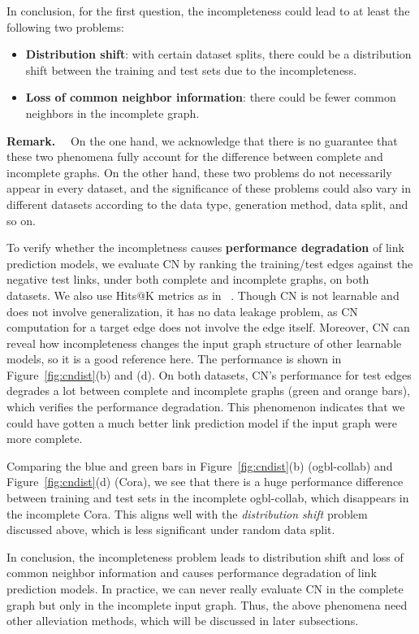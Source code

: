 \documentclass{article}
\theoremstyle{plain}
\theoremstyle{definition}
\theoremstyle{remark}
\begin{document}
In conclusion, for the first question, the incompleteness could lead to at least the following two problems:
\begin{itemize}
[itemsep=0pt,topsep=0pt,parsep=0pt]
    \item \textbf{Distribution shift}: with certain dataset splits, there could be a distribution shift between the training and test sets due to the incompleteness.
    \item \textbf{Loss of common neighbor information}: there could be fewer common neighbors in the incomplete graph. 
\end{itemize}

\textbf{Remark.}~~  On the one hand, we acknowledge that there is no guarantee that these two phenomena fully account for the difference between complete and incomplete graphs. On the other hand, these two problems do not necessarily appear in every dataset, and the significance of these problems could also vary in different datasets according to the data type, generation method, data split, and so on. 


To verify whether the incompletness causes \textbf{performance degradation} of link prediction models, we evaluate CN by ranking the training/test edges against the negative test links, under both complete and incomplete graphs, on both datasets. We also use Hits@K metrics as in ~\citep{Gsketch}.
Though CN is not learnable and does not involve generalization, it has no data leakage problem, as
CN computation for a target edge does not involve the edge itself. Moreover, CN can reveal how incompleteness changes the input graph structure of other learnable models, so it is a good reference here. The performance is shown in Figure~\ref{fig:cndist}(b) and (d). On both datasets, CN's performance for test edges degrades a lot between complete and incomplete graphs (green and orange bars), which verifies the performance degradation. This phenomenon indicates that we could have gotten a much better link prediction model if the input graph were more complete.


Comparing the blue and green bars in Figure~\ref{fig:cndist}(b) (ogbl-collab) and Figure~\ref{fig:cndist}(d) (Cora), we see that there is a huge performance difference between training and test sets in the incomplete ogbl-collab, which disappears in the incomplete Cora. This aligns well with the \textit{distribution shift} problem discussed above, which is less significant under random data split. 

In conclusion, the incompleteness problem leads to distribution shift and loss of common neighbor information and causes performance degradation of link prediction models. In practice, we can never really evaluate CN in the complete graph but only in the incomplete input graph. Thus, the above phenomena need other alleviation methods, which will be discussed in later subsections.
\end{document}
